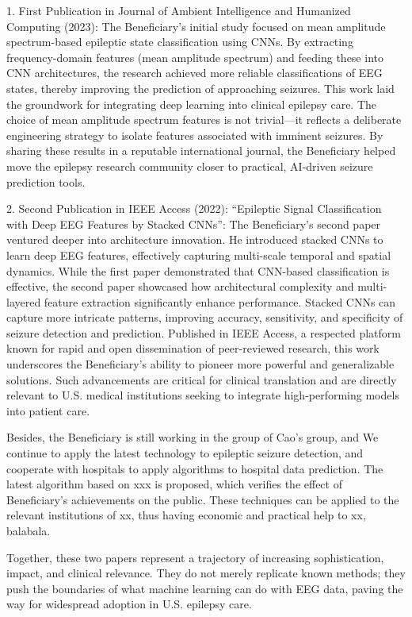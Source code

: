 \documentclass{article}
\begin{document}
1. First Publication in Journal of Ambient Intelligence and Humanized Computing (2023):
The Beneficiary’s initial study focused on mean amplitude spectrum-based epileptic state classification using CNNs. By extracting frequency-domain features (mean amplitude spectrum) and feeding these into CNN architectures, the research achieved more reliable classifications of EEG states, thereby improving the prediction of approaching seizures. This work laid the groundwork for integrating deep learning into clinical epilepsy care. The choice of mean amplitude spectrum features is not trivial—it reflects a deliberate engineering strategy to isolate features associated with imminent seizures. By sharing these results in a reputable international journal, the Beneficiary helped move the epilepsy research community closer to practical, AI-driven seizure prediction tools.

2. Second Publication in IEEE Access (2022): “Epileptic Signal Classification with Deep EEG Features by Stacked CNNs”:
The Beneficiary’s second paper ventured deeper into architecture innovation. He introduced stacked CNNs to learn deep EEG features, effectively capturing multi-scale temporal and spatial dynamics. While the first paper demonstrated that CNN-based classification is effective, the second paper showcased how architectural complexity and multi-layered feature extraction significantly enhance performance. Stacked CNNs can capture more intricate patterns, improving accuracy, sensitivity, and specificity of seizure detection and prediction. Published in IEEE Access, a respected platform known for rapid and open dissemination of peer-reviewed research, this work underscores the Beneficiary’s ability to pioneer more powerful and generalizable solutions. Such advancements are critical for clinical translation and are directly relevant to U.S. medical institutions seeking to integrate high-performing models into patient care.

Besides, the Beneficiary is still working in the group of Cao's group, and We continue to apply the latest technology to epileptic seizure detection, and cooperate with hospitals to apply algorithms to hospital data prediction. The latest algorithm based on xxx is proposed, which verifies the effect of Beneficiary's achievements on the public. These techniques can be applied to the relevant institutions of xx, thus having economic and practical help to xx, balabala.


Together, these two papers represent a trajectory of increasing sophistication, impact, and clinical relevance. They do not merely replicate known methods; they push the boundaries of what machine learning can do with EEG data, paving the way for widespread adoption in U.S. epilepsy care.
\end{document}
